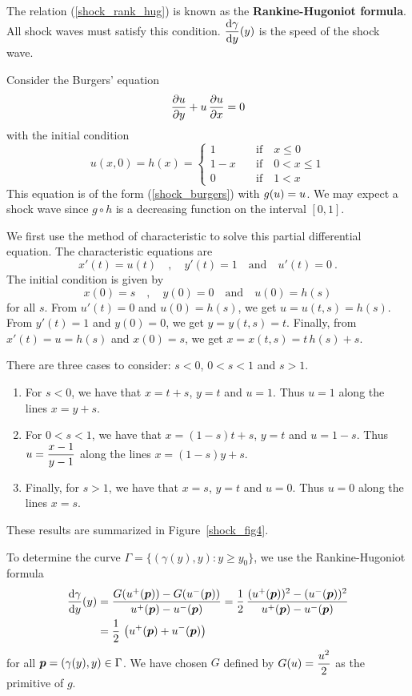 The relation (\ref{shock_rank_hug}) is known as the
{\bfseries Rankine-Hugoniot formula}.
All shock waves must satisfy this condition.
$\displaystyle \frac{\mathrm{d}\gamma}{\mathrm{d}{y}}(y)$ is the speed of the shock wave.

\begin{egg}
Consider the Burgers' equation
\begin{equation} \label{shock_the_burgers}
\frac{\partial{u}}{\partial y} + u\,\frac{\partial{u}}{\partial x} = 0
\end{equation}
with the initial condition
\[
u(x,0) = h(x) =
\begin{cases} 1 & \quad \text{if} \quad x \leq 0 \\
1-x & \quad \text{if} \quad 0<x\leq 1 \\
0 & \quad \text{if} \quad 1 < x
\end{cases}
\]
This equation is of the form (\ref{shock_burgers}) with
$\displaystyle g(u) = u$.  We may expect a shock wave since $g\circ h$
is a decreasing function on the interval $[0,1]$.

We first use the method of characteristic to solve this partial
differential equation.  The characteristic equations are
\[
x'(t) = u(t) \quad , \quad y'(t) = 1 \quad \text{and} \quad u'(t) = 0 \ .
\]
The initial condition is given by
\[
x(0) = s \quad , \quad y(0) = 0 \quad \text{and} \quad u(0) = h(s)
\]
for all $s$.  From $u'(t)=0$ and $u(0)=h(s)$, we get $u = u(t,s) = h(s)$.
From $y'(t)=1$ and $y(0)=0$, we get $y = y(t,s) = t$.  Finally, from
$x'(t) = u = h(s)$ and $x(0)=s$, we get $x = x(t,s) = t\,h(s) + s$.

There are three cases to consider: $s<0$, $0<s<1$ and $s>1$.
\begin{enumerate}
\item For $s<0$, we have that $x = t+s$, $y=t$ and $u=1$.  Thus $u=1$ along the
lines $x = y +s$.
\item For $0<s<1$, we have that $x = (1-s)t+s$, $y=t$ and
$u=1-s$.  Thus $\displaystyle u=\frac{x-1}{y-1}$ along the lines
$x = (1-s)y +s$.
\item Finally, for $s>1$, we have that $x = s$, $y=t$ and
$u=0$.  Thus $u=0$ along the lines $x = s$.
\end{enumerate}
These results are summarized in Figure~\ref{shock_fig4}.


To determine the curve $\Gamma = \{ (\gamma(y),y) : y \geq y_0 \}$, we use the
Rankine-Hugoniot formula
\begin{equation} \label{BERankHugForm}
\begin{split}
\frac{\mathrm{d}\gamma}{\mathrm{d}{y}}(y) &= \frac{G(u^+({\bm{p}}))-G(u^-({\bm{p}}))}
{u^+({\bm{p}}) - u^-({\bm{p}})} =
\frac{1}{2} \, \frac{(u^+({\bm{p}}))^2 - (u^-({\bm{p}}))^2}
{u^+({\bm{p}}) - u^-({\bm{p}})} \\
&= \frac{1}{2} \, \left(u^+({\bm{p}}) + u^-({\bm{p}})\right)
\end{split}
\end{equation}
for all ${\bm{p}}=(\gamma(y),y) \in \Gamma$.  We have chosen $G$
defined by $\displaystyle G(u) = \frac{u^2}{2}$ as the primitive of $g$.


\end{egg}
